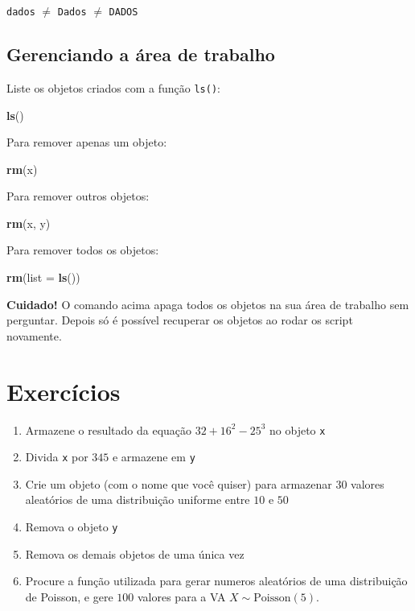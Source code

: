 \documentclass[10pt,a4paper]{book}
\newenvironment{Shaded}{\begin{snugshade}}{\end{snugshade}}
\newcommand{\KeywordTok}[1]{\textcolor[rgb]{0.13,0.29,0.53}{\textbf{#1}}}
\newcommand{\DataTypeTok}[1]{\textcolor[rgb]{0.13,0.29,0.53}{#1}}
\newcommand{\NormalTok}[1]{#1}
\providecommand{\tightlist}{%
  \setlength{\itemsep}{0pt}\setlength{\parskip}{0pt}}
\begin{document}
\texttt{dados} \(\neq\) \texttt{Dados} \(\neq\) \texttt{DADOS}

\subsection{Gerenciando a área de
trabalho}\label{gerenciando-a-area-de-trabalho}

Liste os objetos criados com a função \texttt{ls()}:

\begin{Shaded}
\begin{Highlighting}[]
\KeywordTok{ls}\NormalTok{()}
\end{Highlighting}
\end{Shaded}

Para remover apenas um objeto:

\begin{Shaded}
\begin{Highlighting}[]
\KeywordTok{rm}\NormalTok{(x)}
\end{Highlighting}
\end{Shaded}

Para remover outros objetos:

\begin{Shaded}
\begin{Highlighting}[]
\KeywordTok{rm}\NormalTok{(x, y)}
\end{Highlighting}
\end{Shaded}

Para remover todos os objetos:

\begin{Shaded}
\begin{Highlighting}[]
\KeywordTok{rm}\NormalTok{(}\DataTypeTok{list =} \KeywordTok{ls}\NormalTok{())}
\end{Highlighting}
\end{Shaded}

\textbf{Cuidado!} O comando acima apaga todos os objetos na sua área de
trabalho sem perguntar. Depois só é possível recuperar os objetos ao
rodar os script novamente.

\section*{Exercícios}\label{exercicios-2}


\begin{enumerate}
\def\labelenumi{\arabic{enumi}.}
\tightlist
\item
  Armazene o resultado da equação \(32 + 16^2 - 25^3\) no objeto
  \texttt{x}
\item
  Divida \texttt{x} por \(345\) e armazene em \texttt{y}
\item
  Crie um objeto (com o nome que você quiser) para armazenar \(30\)
  valores aleatórios de uma distribuição uniforme entre \(10\) e \(50\)
\item
  Remova o objeto \texttt{y}
\item
  Remova os demais objetos de uma única vez
\item
  Procure a função utilizada para gerar numeros aleatórios de uma
  distribuição de Poisson, e gere \(100\) valores para a VA
  \(X \sim  \text{Poisson}(5)\).
\end{enumerate}
\end{document}
